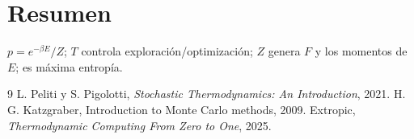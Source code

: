 \documentclass[11pt,a4paper]{article}
\begin{document}
\section{Resumen}
$p=e^{-\beta E}/Z$; $T$ controla exploración/optimización; $Z$ genera $F$ y los momentos de $E$; es máxima entropía.

\begin{thebibliography}{9}\small
{} L. Peliti y S. Pigolotti, \emph{Stochastic Thermodynamics: An Introduction}, 2021.
 H. G. Katzgraber, Introduction to Monte Carlo methods, 2009.
 Extropic, \emph{Thermodynamic Computing From Zero to One}, 2025.
\end{thebibliography}
\end{document}
